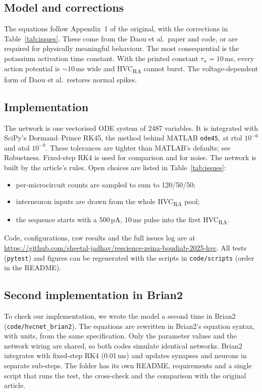 \subsection*{Model and corrections}
The equations follow Appendix~1 of the original, with the corrections in
Table~\ref{tab:issues}. These come from the Daou et al.\ paper and code, or are required for
physically meaningful behaviour. The most consequential is the potassium activation time
constant. With the printed constant $\tau_n = 10$\,ms, every action potential is
$\sim$10\,ms wide and HVC\textsubscript{RA} cannot burst. The voltage-dependent form of Daou et
al.\ restores normal spikes.

\subsection*{Implementation}
The network is one vectorised ODE system of 2487 variables. It is integrated with SciPy's
Dormand--Prince RK45\supercite{Dormand1980,Virtanen2020}, the method behind MATLAB
\texttt{ode45}, at rtol $10^{-6}$ and atol $10^{-9}$. These tolerances are tighter than
MATLAB's defaults; see Robustness. Fixed-step RK4 is used for comparison and for noise. The
network is built by the article's rules. Open choices are listed in Table~\ref{tab:issues}:
\begin{itemize}
\item per-microcircuit counts are sampled to sum to 120/50/50;
\item interneuron inputs are drawn from the whole HVC\textsubscript{RA} pool;
\item the sequence starts with a 500\,pA, 10\,ms pulse into the first HVC\textsubscript{RA}.
\end{itemize}
Code, configurations, raw results and the full issues log are at
\url{https://github.com/sheetal-jadhav/rescience-zeina-boudiab-2025-hvc}. All tests (\texttt{pytest}) and
figures can be regenerated with the scripts in \texttt{code/scripts} (order in the README).

\subsection*{Second implementation in Brian2}
To check our implementation, we wrote the model a second time in Brian2\supercite{Stimberg2019}
(\texttt{code/hvcnet\_brian2}). The equations are rewritten in Brian2's equation syntax, with
units, from the same specification. Only the parameter values and the network wiring are
shared, so both codes simulate identical networks. Brian2 integrates with fixed-step RK4
(0.01\,ms) and updates synapses and neurons in separate sub-steps. The folder has its own
README, requirements and a single script that runs the test, the cross-check and the comparison
with the original article.

